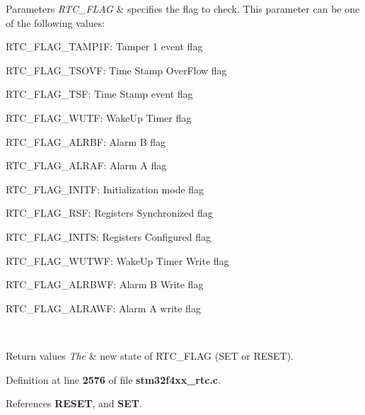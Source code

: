 \begin{DoxyParams}{Parameters}
{\em R\+T\+C\+\_\+\+F\+L\+AG} & specifies the flag to check. This parameter can be one of the following values\+: \begin{DoxyItemize}
\item R\+T\+C\+\_\+\+F\+L\+A\+G\+\_\+\+T\+A\+M\+P1F\+: Tamper 1 event flag \item R\+T\+C\+\_\+\+F\+L\+A\+G\+\_\+\+T\+S\+O\+VF\+: Time Stamp Over\+Flow flag \item R\+T\+C\+\_\+\+F\+L\+A\+G\+\_\+\+T\+SF\+: Time Stamp event flag \item R\+T\+C\+\_\+\+F\+L\+A\+G\+\_\+\+W\+U\+TF\+: Wake\+Up Timer flag \item R\+T\+C\+\_\+\+F\+L\+A\+G\+\_\+\+A\+L\+R\+BF\+: Alarm B flag \item R\+T\+C\+\_\+\+F\+L\+A\+G\+\_\+\+A\+L\+R\+AF\+: Alarm A flag \item R\+T\+C\+\_\+\+F\+L\+A\+G\+\_\+\+I\+N\+I\+TF\+: Initialization mode flag \item R\+T\+C\+\_\+\+F\+L\+A\+G\+\_\+\+R\+SF\+: Registers Synchronized flag \item R\+T\+C\+\_\+\+F\+L\+A\+G\+\_\+\+I\+N\+I\+TS\+: Registers Configured flag \item R\+T\+C\+\_\+\+F\+L\+A\+G\+\_\+\+W\+U\+T\+WF\+: Wake\+Up Timer Write flag \item R\+T\+C\+\_\+\+F\+L\+A\+G\+\_\+\+A\+L\+R\+B\+WF\+: Alarm B Write flag \item R\+T\+C\+\_\+\+F\+L\+A\+G\+\_\+\+A\+L\+R\+A\+WF\+: Alarm A write flag \end{DoxyItemize}
\\
\hline
\end{DoxyParams}

\begin{DoxyRetVals}{Return values}
{\em The} & new state of R\+T\+C\+\_\+\+F\+L\+AG (S\+ET or R\+E\+S\+ET). \\
\hline
\end{DoxyRetVals}


Definition at line \textbf{ 2576} of file \textbf{ stm32f4xx\+\_\+rtc.\+c}.



References \textbf{ R\+E\+S\+ET}, and \textbf{ S\+ET}.


